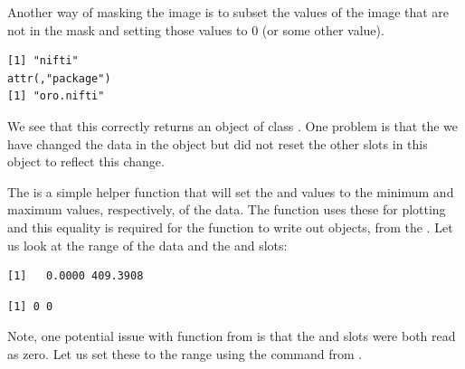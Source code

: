 Another way of masking the image is to subset the values of the image that are not in the mask and setting those values to $0$ (or some other value).
\begin{knitrout}
\color{fgcolor}\begin{kframe}
\begin{alltt}
 \hlkwb{=} 
\hlstd{base_t1_2[base_t1_mask} \hlopt{==} \hlstd{]} \hlkwb{=} 
\end{alltt}
\begin{verbatim}
[1] "nifti"
attr(,"package")
[1] "oro.nifti"
\end{verbatim}
\end{kframe}
\end{knitrout}

We see that this correctly returns an object of class .  One problem is that the we have changed the data in the  object   but did not reset the other slots in this object to reflect this change.


The  is a simple helper function that will set the  and  values to the minimum and maximum values, respectively, of the data.   The  function uses these for plotting and this equality is required for the  function to write out  objects, from the .  Let us look at the range of the data and the  and  slots:

\begin{knitrout}
\color{fgcolor}\begin{kframe}
\begin{alltt}
\end{alltt}
\begin{verbatim}
[1]   0.0000 409.3908
\end{verbatim}
\begin{alltt}
\hlstd{)}
\end{alltt}
\begin{verbatim}
[1] 0 0
\end{verbatim}
\end{kframe}
\end{knitrout}

Note, one potential issue with  function from  is that the  and  slots were both read as zero.  Let us set these to the range using the  command from .

